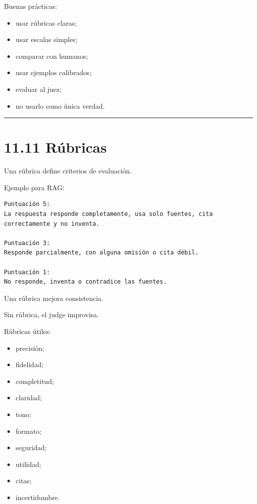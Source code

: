Buenas prácticas:

\begin{itemize}
\tightlist
\item
  usar rúbricas claras;
\item
  usar escalas simples;
\item
  comparar con humanos;
\item
  usar ejemplos calibrados;
\item
  evaluar al juez;
\item
  no usarlo como única verdad.
\end{itemize}

\begin{center}\rule{0.5\linewidth}{0.5pt}\end{center}

\section{11.11 Rúbricas}\label{ruxfabricas}

Una rúbrica define criterios de evaluación.

Ejemplo para RAG:

\begin{lstlisting}
Puntuación 5:
La respuesta responde completamente, usa solo fuentes, cita correctamente y no inventa.

Puntuación 3:
Responde parcialmente, con alguna omisión o cita débil.

Puntuación 1:
No responde, inventa o contradice las fuentes.
\end{lstlisting}

Una rúbrica mejora consistencia.

Sin rúbrica, el judge improvisa.

Rúbricas útiles:

\begin{itemize}
\tightlist
\item
  precisión;
\item
  fidelidad;
\item
  completitud;
\item
  claridad;
\item
  tono;
\item
  formato;
\item
  seguridad;
\item
  utilidad;
\item
  citas;
\item
  incertidumbre.
\end{itemize}

